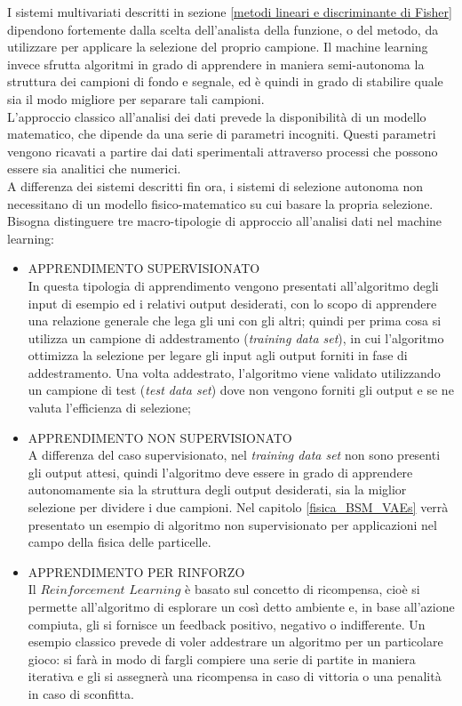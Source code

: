 I sistemi multivariati descritti in sezione \ref{metodi lineari e discriminante di Fisher} dipendono fortemente dalla scelta dell'analista della funzione, o del metodo, da utilizzare per applicare la selezione del proprio campione. Il machine learning invece sfrutta algoritmi in grado di apprendere in maniera semi-autonoma la struttura dei campioni di fondo e segnale, ed è quindi in grado di stabilire quale sia il modo migliore per separare tali campioni. \\
L'approccio classico all'analisi dei dati prevede la disponibilità di un modello matematico, che dipende da una serie di parametri incogniti. Questi parametri vengono ricavati a partire dai dati sperimentali attraverso processi che possono essere sia analitici che numerici. \\
A differenza dei sistemi descritti fin ora, i sistemi di selezione autonoma non necessitano di un modello fisico-matematico su cui basare la propria selezione. \\
Bisogna distinguere tre macro-tipologie di approccio all'analisi dati nel machine learning:
\begin{itemize}
	
	\item APPRENDIMENTO SUPERVISIONATO \\
	In questa tipologia di apprendimento vengono presentati all'algoritmo degli input di esempio ed i relativi output desiderati, con lo scopo di apprendere una relazione generale che lega gli uni con gli altri; quindi per prima cosa si utilizza un campione di addestramento (\textit{training data set}), in cui l'algoritmo ottimizza la selezione per legare gli input agli output forniti in fase di addestramento. Una volta addestrato, l'algoritmo viene validato utilizzando un campione di test (\textit{test data set}) dove non vengono forniti gli output e se ne valuta l'efficienza di selezione;
	
	\item APPRENDIMENTO NON SUPERVISIONATO \\
	A differenza del caso supervisionato, nel \textit{training data set} non sono presenti gli output attesi, quindi l'algoritmo deve essere in grado di apprendere autonomamente sia la struttura degli output desiderati, sia la miglior selezione per dividere i due campioni.
	Nel capitolo \ref{fisica_BSM_VAEs} verrà presentato un esempio di algoritmo non supervisionato per applicazioni nel campo della fisica delle particelle.
	
	\item APPRENDIMENTO PER RINFORZO \\
	Il $\textit{Reinforcement Learning}$ è basato sul concetto di ricompensa, cioè si permette all'algoritmo di esplorare un così detto ambiente e, in base all'azione compiuta, gli si fornisce un feedback positivo, negativo o indifferente. Un esempio classico prevede di voler addestrare un algoritmo per un particolare gioco: si farà in modo di fargli compiere una serie di partite in maniera iterativa e gli si assegnerà una ricompensa in caso di vittoria o una penalità in caso di sconfitta. \\ 
\end{itemize}

